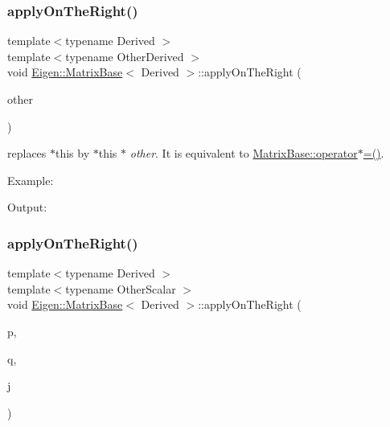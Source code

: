 \subsubsection{\texorpdfstring{applyOnTheRight()}{applyOnTheRight()}\hspace{0.1cm}{\footnotesize\ttfamily [1/2]}}
{\footnotesize\ttfamily template$<$typename Derived $>$ \\
template$<$typename Other\+Derived $>$ \\
void \mbox{\hyperlink{class_eigen_1_1_matrix_base}{Eigen\+::\+Matrix\+Base}}$<$ Derived $>$\+::apply\+On\+The\+Right (\begin{DoxyParamCaption}\item[{const \mbox{\hyperlink{struct_eigen_1_1_eigen_base}{Eigen\+Base}}$<$ Other\+Derived $>$ \&}]{other }\end{DoxyParamCaption})\hspace{0.3cm}{\ttfamily [inline]}}

replaces {\ttfamily $\ast$this} by {\ttfamily $\ast$this} $\ast$ {\itshape other}. It is equivalent to \mbox{\hyperlink{class_eigen_1_1_matrix_base_aaa2fc32463392a7488686e6f3007f278}{Matrix\+Base\+::operator$\ast$=()}}.

Example\+: 
\begin{DoxyCodeInclude}{0}
\end{DoxyCodeInclude}
 Output\+: 
\begin{DoxyVerbInclude}
\end{DoxyVerbInclude}
 \mbox{\label{class_eigen_1_1_matrix_base_aa07f741c86219601664433777827bf1c}} 
\subsubsection{\texorpdfstring{applyOnTheRight()}{applyOnTheRight()}\hspace{0.1cm}{\footnotesize\ttfamily [2/2]}}
{\footnotesize\ttfamily template$<$typename Derived $>$ \\
template$<$typename Other\+Scalar $>$ \\
void \mbox{\hyperlink{class_eigen_1_1_matrix_base}{Eigen\+::\+Matrix\+Base}}$<$ Derived $>$\+::apply\+On\+The\+Right (\begin{DoxyParamCaption}\item[{Index}]{p,  }\item[{Index}]{q,  }\item[{const \mbox{\hyperlink{class_eigen_1_1_jacobi_rotation}{Jacobi\+Rotation}}$<$ Other\+Scalar $>$ \&}]{j }\end{DoxyParamCaption})\hspace{0.3cm}{\ttfamily [inline]}}

